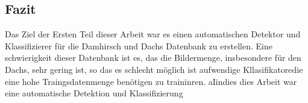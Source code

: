 \subsection{Fazit}
Das Ziel der Ersten Teil dieser Arbeit war es einen automatischen Detektor und Klassifizierer für die Damhirsch und Dachs Datenbank zu erstellen. Eine schwierigkeit dieser Datenbank ist es, das die Bildermenge, insbesondere für den Dachs, sehr gering ist, so das es schlecht möglich ist aufwendige Kllasifikatoredie eine hohe Traingsdatenmenge benötigen zu traininren.  aIindies dies Arbeit war eine automatische Detektion und Klassifizierung


